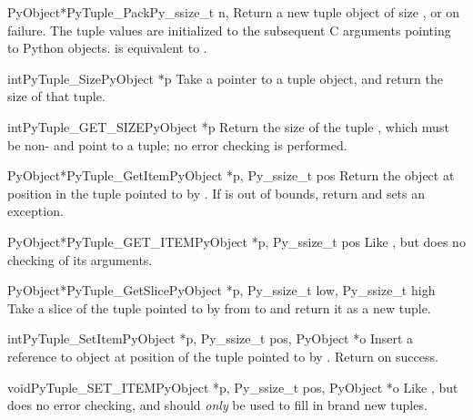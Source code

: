 \begin{cfuncdesc}{PyObject*}{PyTuple_Pack}{Py_ssize_t n, \moreargs}
  Return a new tuple object of size , or \NULL{} on failure.
  The tuple values are initialized to the subsequent  C arguments
  pointing to Python objects.  
  is equivalent to .
\end{cfuncdesc}

\begin{cfuncdesc}{int}{PyTuple_Size}{PyObject *p}
  Take a pointer to a tuple object, and return the size of that
  tuple.
\end{cfuncdesc}

\begin{cfuncdesc}{int}{PyTuple_GET_SIZE}{PyObject *p}
  Return the size of the tuple , which must be non-\NULL{} and
  point to a tuple; no error checking is performed.
\end{cfuncdesc}

\begin{cfuncdesc}{PyObject*}{PyTuple_GetItem}{PyObject *p, Py_ssize_t pos}
  Return the object at position  in the tuple pointed to by
  .  If  is out of bounds, return \NULL{} and sets an
   exception.
\end{cfuncdesc}

\begin{cfuncdesc}{PyObject*}{PyTuple_GET_ITEM}{PyObject *p, Py_ssize_t pos}
  Like , but does no checking of its
  arguments.
\end{cfuncdesc}

\begin{cfuncdesc}{PyObject*}{PyTuple_GetSlice}{PyObject *p,
                                               Py_ssize_t low, Py_ssize_t high}
  Take a slice of the tuple pointed to by  from  to
   and return it as a new tuple.
\end{cfuncdesc}

\begin{cfuncdesc}{int}{PyTuple_SetItem}{PyObject *p,
                                        Py_ssize_t pos, PyObject *o}
  Insert a reference to object  at position  of the
  tuple pointed to by . Return  on success.
\end{cfuncdesc}

\begin{cfuncdesc}{void}{PyTuple_SET_ITEM}{PyObject *p,
                                          Py_ssize_t pos, PyObject *o}
  Like , but does no error checking, and
  should \emph{only} be used to fill in brand new tuples.  
\end{cfuncdesc}

